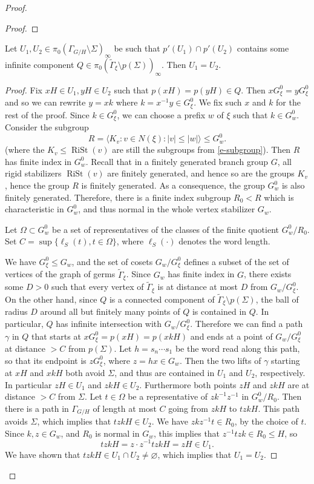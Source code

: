 \documentclass[10pt,a4paper]{amsart}
\newcommand{\Gammatilde}{\ensuremath{\widetilde{\Gamma}}}%
\newcommand{\rist}{\ensuremath{\operatorname{RiSt}}}%
\begin{document}
\begin{proof}
\begin{proof}
    
\end{proof}

\begin{lemma} \label{l-ends-injection}
    Let $U_1, U_2\in \pi_0(\Gamma_{G/H}\setminus\Sigma)_\infty$ be such that $p'(U_1)\cap p'(U_2)$ contains some infinite component $Q\in \pi_0(\Gammatilde_\xi\setminus p(\Sigma))_\infty$. Then $U_1=U_2$.
\end{lemma}
\begin{proof}
    Fix $xH\in U_1, yH\in U_2$ such that $p(xH)=p(yH)\in Q$. Then $xG^0_\xi=yG^0_\xi$ and so we can rewrite $y=xk$ where $k=x^{-1}y\in G^0_\xi$. We fix such $x$ and $k$ for the rest of the proof. Since $k\in G^0_\xi$, we can choose a prefix $w$ of $\xi$ such that $k\in G_w^0$. Consider the subgroup
\[R=\langle K_v \colon v\in N(\xi) \colon |v|\le |w|\rangle\le G_w^0.\]
(where the $K_v\leq \rist(v)$ are still the subgroups from \eqref{e-subgroup}). Then $R$ has finite index in $G_w^0$.  Recall that in a finitely generated branch group $G$, all rigid stabilizers $\rist(v)$ are finitely generated, and hence so are the groups $K_v$, hence the group $R$ is finitely generated. As a consequence, the group  $G_w^0$ is also finitely generated. Therefore, there is a finite index subgroup $R_0<R$ which is characteristic in $G_w^0$, and thus normal in the whole vertex stabilizer $G_w$.

Let $\Omega\subset G_w^0$ be a set of representatives of the classes of the finite quotient $G_w^0/R_0$. Set $C=\sup\{\ell_S(t), t\in \Omega\}$, where $\ell_S(\cdot)$ denotes the word length.

We have $G^0_\xi\le G_w$, and the set of cosets $G_w/G^0_\xi$ defines a subset of the set of vertices  of the graph of germs $\Gammatilde_\xi$. Since $G_w$ has finite index in $G$, there exists some $D>0$ such that every vertex of $\Gammatilde_\xi$ is at distance at most $D$ from $G_w/G^0_\xi$. On the other hand, since $Q$ is a connected component of $\Gammatilde_\xi \setminus p(\Sigma)$, the ball of radius $D$ around all but finitely many points of $Q$ is contained in $Q$. In particular, $Q$ has infinite intersection with $G_w/G^0_\xi$.  Therefore we can find a path $\gamma$ in $Q$ that starts at $xG_\xi^0=p(xH)=p(xkH)$ and ends at  a point  of $G_w/G^0_\xi$ at distance $>C$ from $p(\Sigma)$. Let $h=s_n\cdots s_1$ be the word read along this path, so that its endpoint is $zG_\xi^0$, where $z=hx\in G_w$. Then the two lifts of $\gamma$ starting at $xH$ and $xkH$ both avoid $\Sigma$, and thus are contained in $U_1$ and $U_2$, respectively. In particular $zH\in U_1$ and $zkH\in U_2$.  Furthermore both points $zH$ and $zkH$ are at distance $>C$ from $\Sigma$. Let $t\in \Omega$ be a representative of $zk^{-1}z^{-1}$ in $G_w^0/R_0$. Then there is a path in $\Gamma_{G/H}$ of length at most $C$ going from $zkH$ to $tzkH$. This path avoids $\Sigma$, which implies that $tzkH\in U_2$. We have $zkz^{-1}t\in R_0$, by the choice of $t$. Since $k, z\in G_w$, and $R_0$ is normal in $G_w$, this implies that $z^{-1}tzk\in R_0\le H$, so
\[tzkH=z\cdot z^{-1}tzkH=zH\in U_1.\]
We have shown that $tzkH\in U_1\cap U_2\neq \varnothing$,
which implies that $U_1=U_2$. \qedhere
    

\end{proof}
\end{proof}
\end{document}
